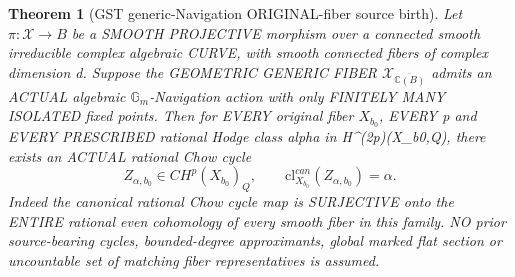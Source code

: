 \documentclass[11pt]{article}
\newtheorem{theorem}{Theorem}
\begin{document}
\begin{theorem}[GST generic-Navigation ORIGINAL-fiber source birth]
Let \(\pi:\mathcal X\to B\) be a SMOOTH
PROJECTIVE morphism over a connected
smooth irreducible complex algebraic
CURVE, with smooth connected fibers
of complex dimension d. Suppose the
GEOMETRIC GENERIC FIBER
\(\mathcal X_{\overline{\mathbb C(B)}}\)
admits an ACTUAL algebraic
\(\mathbb G_m\)-Navigation action with
only FINITELY MANY ISOLATED fixed
points. Then for EVERY original fiber
\(X_{b_0}\), EVERY p and EVERY
PRESCRIBED rational Hodge class
alpha in H^(2p)(X_b0,Q), there exists
an ACTUAL rational Chow cycle
\[
\boxed{
Z_{\alpha,b_0}\in CH^p(X_{b_0})_Q,
\qquad
\mathrm{cl}^{can}_{X_{b_0}}
(Z_{\alpha,b_0})=\alpha.
}
\]
Indeed the canonical rational Chow
cycle map is SURJECTIVE onto the
ENTIRE rational even cohomology
of every smooth fiber in this family.
NO prior source-bearing cycles,
bounded-degree approximants,
global marked flat section or
uncountable set of matching
fiber representatives is assumed.
\end{theorem}
\end{document}
